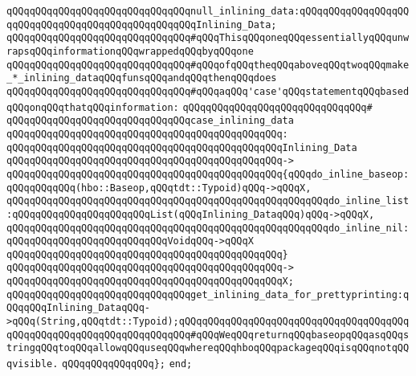\newline
\verb|qQQqqQQqqQQqqQQqqQQqqQQqqQQqqQQqnull_inlining_data:qQQqqQQqqQQqqQQqqQQqqQQqqQQqqQQqqQQqqQQqqQQqqQQqqQQqInlining_Data;|\newline
\newline
\verb|qQQqqQQqqQQqqQQqqQQqqQQqqQQqqQQq#qQQqThisqQQqoneqQQqessentiallyqQQqunwrapsqQQqinformationqQQqwrappedqQQqbyqQQqone|\newline
\verb|qQQqqQQqqQQqqQQqqQQqqQQqqQQqqQQq#qQQqofqQQqtheqQQqaboveqQQqtwoqQQqmake_*_inlining_dataqQQqfunsqQQqandqQQqthenqQQqdoes|\newline
\verb|qQQqqQQqqQQqqQQqqQQqqQQqqQQqqQQq#qQQqaqQQq'case'qQQqstatementqQQqbasedqQQqonqQQqthatqQQqinformation:|\newline
\verb|qQQqqQQqqQQqqQQqqQQqqQQqqQQqqQQq#|\newline
\verb|qQQqqQQqqQQqqQQqqQQqqQQqqQQqqQQqcase_inlining_data|\newline
\verb|qQQqqQQqqQQqqQQqqQQqqQQqqQQqqQQqqQQqqQQqqQQqqQQq:|\newline
\verb|qQQqqQQqqQQqqQQqqQQqqQQqqQQqqQQqqQQqqQQqqQQqqQQqInlining_Data|\newline
\verb|qQQqqQQqqQQqqQQqqQQqqQQqqQQqqQQqqQQqqQQqqQQqqQQq->|\newline
\verb|qQQqqQQqqQQqqQQqqQQqqQQqqQQqqQQqqQQqqQQqqQQqqQQq{qQQqdo_inline_baseop:qQQqqQQqqQQq(hbo::Baseop,qQQqtdt::Typoid)qQQq->qQQqX,|\newline
\verb|qQQqqQQqqQQqqQQqqQQqqQQqqQQqqQQqqQQqqQQqqQQqqQQqqQQqqQQqdo_inline_list:qQQqqQQqqQQqqQQqqQQqqQQqList(qQQqInlining_DataqQQq)qQQq->qQQqX,|\newline
\verb|qQQqqQQqqQQqqQQqqQQqqQQqqQQqqQQqqQQqqQQqqQQqqQQqqQQqqQQqdo_inline_nil:qQQqqQQqqQQqqQQqqQQqqQQqqQQqVoidqQQq->qQQqX|\newline
\verb|qQQqqQQqqQQqqQQqqQQqqQQqqQQqqQQqqQQqqQQqqQQqqQQq}|\newline
\verb|qQQqqQQqqQQqqQQqqQQqqQQqqQQqqQQqqQQqqQQqqQQqqQQq->|\newline
\verb|qQQqqQQqqQQqqQQqqQQqqQQqqQQqqQQqqQQqqQQqqQQqqQQqX;|\newline
\newline
\verb|qQQqqQQqqQQqqQQqqQQqqQQqqQQqqQQqget_inlining_data_for_prettyprinting:qQQqqQQqInlining_DataqQQq->qQQq(String,qQQqtdt::Typoid);qQQqqQQqqQQqqQQqqQQqqQQqqQQqqQQqqQQqqQQqqQQqqQQqqQQqqQQqqQQqqQQqqQQqqQQq#qQQqWeqQQqreturnqQQqbaseopqQQqasqQQqstringqQQqtoqQQqallowqQQquseqQQqwhereqQQqhboqQQqpackageqQQqisqQQqnotqQQqvisible.|\newline
\verb|qQQqqQQqqQQqqQQq};|\newline
\newline
\verb|end;|\newline

